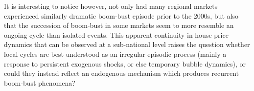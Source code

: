 \documentclass[11pt]{article}
\begin{document}
It is interesting to notice however, not only had many regional markets experienced similarly dramatic boom-bust episode prior to the 2000s, but also that the succession of boom-bust in some markets seem to more resemble an ongoing cycle than isolated events. %
This apparent continuity in house price dynamics that can be observed at a sub-national level raises the question whether local cycles are best understood as an irregular episodic process (mainly a response to persistent exogenous shocks, or else temporary bubble dynamics), or could they instead reflect an endogenous mechanism which produces recurrent boom-bust phenomena? %





\end{document}
